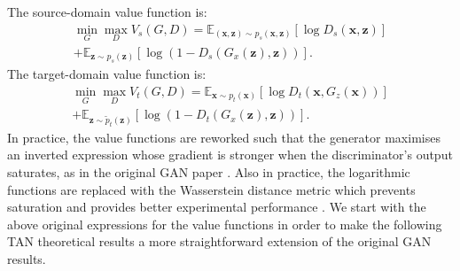 \documentclass{article}
\begin{document}
The source-domain value function is:
\begin{equation}\label{eq:source-value}
\begin{split}
\min_{G} \max_{D} V_s(G, D) = \mathbb{E}_{(\bm{x},\bm{z})\sim p_s(\bm{x},\bm{z})}[\log D_s(\bm{x}, \bm{z})]\\
+ \mathbb{E}_{\bm{z}\sim p_{s}(\bm{z})}[\log (1 - D_s(G_x(\bm{z}), \bm{z}) )].
\end{split}
\end{equation}
The target-domain value function is:
\begin{equation}\label{eq:target-value}
\begin{split}
\min_{G} \max_{D} V_t(G, D) = \mathbb{E}_{\bm{x}\sim p_{t}(\bm{x})}[\log D_t(\bm{x}, G_z(\bm{x}))]\\
+  \mathbb{E}_{\bm{z}\sim \widetilde{p}_{t}(\bm{z})}[\log (1 - D_t(G_x(\bm{z}), \bm{z}))].
\end{split}
\end{equation}
In practice, the value functions are reworked such that the generator maximises an inverted expression whose gradient is stronger when the discriminator's output saturates, as in the original GAN paper \cite{goodfellow2014generative}. Also in practice, the logarithmic functions are replaced with the Wasserstein distance metric which prevents saturation and provides better experimental performance \cite{arjovsky2017wasserstein}. We start with the above original expressions for the value functions in order to make the following TAN theoretical results a more straightforward extension of the original GAN results.
\end{document}
